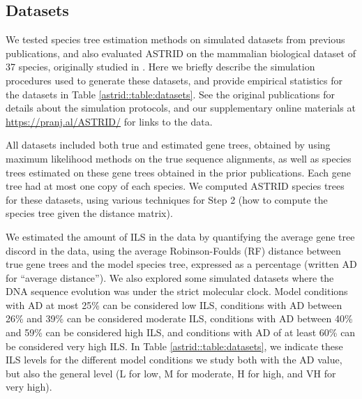 \subsection{Datasets}
We tested species tree estimation methods on 
simulated datasets from previous publications, and also evaluated
ASTRID on the mammalian biological dataset of 37 species,
originally studied in \cite{statbinning}.
Here we briefly describe the simulation procedures used to
generate these datasets, and provide empirical
statistics for the datasets 
in Table \ref{astrid::table:datasets}.
See the original publications for details about the simulation protocols,
and our supplementary online materials at \url{https://pranj.al/ASTRID/} for links to the data.

All datasets
included both true and estimated gene trees, obtained by using maximum likelihood
methods on the true sequence alignments, as well as 
species trees estimated on these gene trees obtained in the
prior publications. 
Each gene tree had at most one copy of each species. 
We computed ASTRID 
species trees for these datasets, using various techniques for
Step 2 (how to compute the species tree given the distance matrix).

We estimated the amount of ILS in the data by quantifying the
average gene tree discord in the data, using the
average Robinson-Foulds (RF) \cite{RF} distance 
between true gene trees and the model species tree,
expressed as a percentage (written AD for ``average distance'').
We also explored some simulated datasets where the DNA sequence
evolution was under the strict molecular clock.
Model conditions with AD at most 25\% can be considered low ILS,
conditions with AD between 26\% and 39\% can be considered moderate ILS,
conditions with AD between 40\% and 59\% can be considered high ILS, and
conditions with AD of at least 60\% can be considered very high ILS. 
In Table \ref{astrid::table:datasets}, we indicate these  ILS levels for the different
model conditions we study both with the AD value, but also the general level (L for low,
M for moderate, H for high, and VH for very high).

